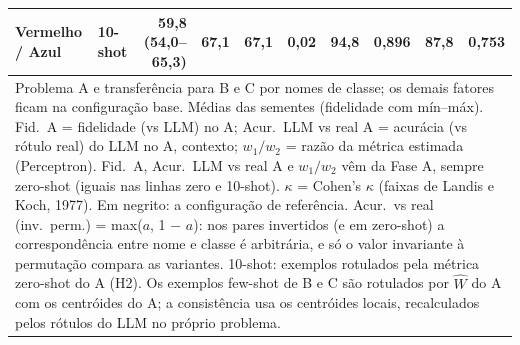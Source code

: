 \begin{table}[htbp]
\begin{tabular}{llrrrrrrrr}
Vermelho / Azul & 10-shot & 59,8 (54,0–65,3) & 67,1 & 67,1 & 0,02 & 94,8 & 0,896 & 87,8 & 0,753 \\
\bottomrule
\multicolumn{10}{p{0.95\linewidth}}{\footnotesize Problema A e transferência para B e C por nomes de classe; os demais fatores ficam na configuração base. Médias das sementes (fidelidade com mín–máx). Fid.\ A = fidelidade (vs LLM) no A; Acur.\ LLM vs real A = acurácia (vs rótulo real) do LLM no A, contexto; $w_1/w_2$ = razão da métrica estimada (Perceptron). Fid.\ A, Acur.\ LLM vs real A e $w_1/w_2$ vêm da Fase A, sempre zero-shot (iguais nas linhas zero e 10-shot). $\kappa$ = Cohen's $\kappa$ (faixas de Landis e Koch, 1977). Em negrito: a configuração de referência. Acur.\ vs real (inv.\ perm.) = max($a$, 1 $-$ $a$): nos pares invertidos (e em zero-shot) a correspondência entre nome e classe é arbitrária, e só o valor invariante à permutação compara as variantes. 10-shot: exemplos rotulados pela métrica zero-shot do A (H2). Os exemplos few-shot de B e C são rotulados por $\hat{W}$ do A com os centróides do A; a consistência usa os centróides locais, recalculados pelos rótulos do LLM no próprio problema.} \\
\end{tabular}
\end{table}
